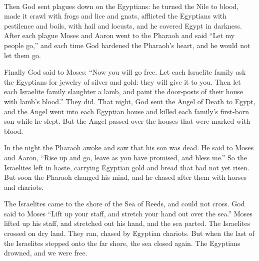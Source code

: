 \documentclass[letter,11pt,openany]{memoir}
\newcommand{\HgFill}{\vfill \hrule \vfill}
\newenvironment{HgEnglish}{\strut\\\noindent}{\vspace{1em}}
\begin{document}
\begin{HgEnglish}
  Then God sent plagues down on the Egyptians: 
  he turned the Nile to blood, 
  made it crawl with frogs and lice and gnats, 
  afflicted the Egyptians with pestilence and boils, 
  with hail and locusts, 
  and he covered Egypt in darkness.
  After each plague Moses and Aaron went to the Pharaoh 
  and said ``Let my people go,'' 
  and each time God hardened the Pharaoh's heart, 
  and he would not let them go.

  Finally God said to Moses: 
  ``Now you will go free.
  Let each Israelite family ask the Egyptians
  for jewelry of silver and gold: 
  they will give it to you.
  Then let each Israelite family slaughter a lamb, 
  and paint the door-posts of their house with lamb's blood.'' 
  They did. 
  That night, God sent the Angel of Death to Egypt, 
  and the Angel went into each Egyptian house 
  and killed each family's first-born son while he slept. 
  But the Angel passed over the houses that were marked with blood.

  In the night the Pharaoh awoke
  and saw that his son was dead. 
  He said to Moses and Aaron,
  ``Rise up and go, leave as you have promised,
  and bless me.''
  So the Israelites left in haste,
  carrying Egyptian gold
  and bread that had not yet risen.
  But soon the Pharaoh changed his mind, 
  and he chased after them with horses and chariots.

  The Israelites came to the shore of the Sea of Reeds, 
  and could not cross. 
  God said to Moses ``Lift up your staff,
  and stretch your hand out over the sea.'' 
  Moses lifted up his staff, 
  and stretched out his hand,
  and the sea parted. 
  The Israelites crossed on dry land. 
  They ran, chased by Egyptian chariots.
  But when the last of the Israelites stepped onto the far shore, 
  the sea closed again.
  The Egyptians drowned, 
  and we were free.

\end{HgEnglish}

%
\end{document}
